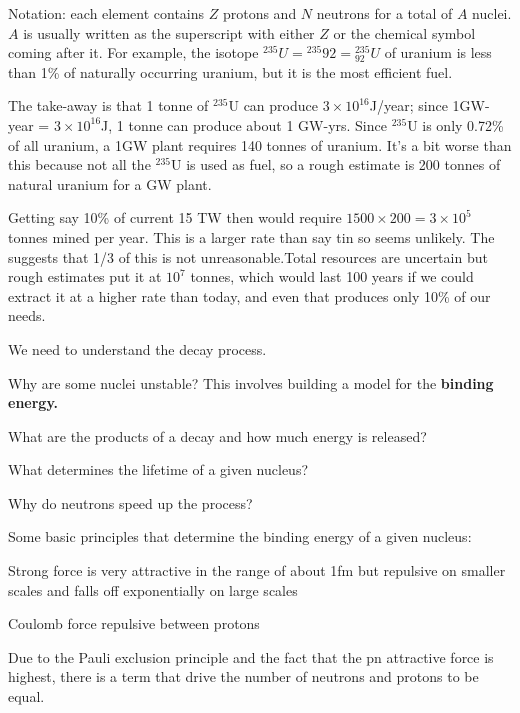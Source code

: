 \documentclass[11pt]{book}
\begin{document}
Notation: each element contains $Z$ protons and $N$ neutrons for a total of $A$ nuclei. $A$ is usually written as the superscript with either $Z$ or the chemical symbol coming after it. For example, the isotope $^{235}U= {}^{235}{92} = {}^{235}_{92}U$ of uranium is less than 1\% of naturally occurring uranium, but it is the most efficient fuel. 

\bee
\item The take-away is that 1 tonne of $^{235}$U can produce $3\times 10^{16}$J/year; since 1GW-year = $3\times 10^{16}$J, 1 tonne can produce about 1 GW-yrs. Since $^{235}$U is only 0.72\% of all uranium, a 1GW plant requires 140 tonnes of uranium. It's a bit worse than this because not all the $^{235}$U is used as fuel, so a rough estimate is 200 tonnes of natural uranium for a GW plant.
\item Getting say 10\% of current 15 TW then would require $1500\times 200=3\times 10^5$ tonnes mined per year. This is a larger rate than say tin so seems unlikely. The suggests that 1/3 of this is not unreasonable.Total resources are uncertain but rough estimates put it at $10^7$ tonnes, which  would last 100 years if we could extract it at a higher rate than today, and even that produces only 10\% of our needs.
\eee

We need to understand the decay process.
\bee
\item Why are some nuclei unstable? This involves building a model for the {\bf binding energy.}
\item What are the products of a decay and how much energy is released?
\item What determines the lifetime of a given nucleus?
\item Why do neutrons speed up the process?
\eee


Some basic principles that determine the binding energy of a given nucleus:
\bei
\item Strong force is very attractive in the range of about 1fm but repulsive on smaller scales and falls off exponentially on large scales
\item Coulomb force repulsive between protons
\item Due to the Pauli exclusion principle and the fact that the pn attractive force is highest, there is a term that drive the number of neutrons and protons to be equal.
\eei
\end{document}
